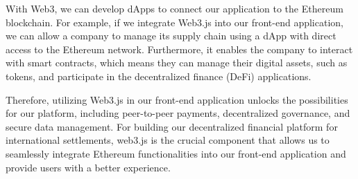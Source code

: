 With Web3, we can develop dApps to connect our application to the Ethereum blockchain. For example, if we integrate Web3.js into our front-end application,
we can allow a company to manage its supply chain using a dApp with direct access to the Ethereum network. Furthermore, it enables the company to
interact with smart contracts, which means they can manage their digital assets, such as tokens,  and participate in the decentralized finance (DeFi) applications.


Therefore, utilizing Web3.js in our front-end application unlocks the possibilities for our platform, including peer-to-peer payments, decentralized
governance, and secure data management. For building our decentralized financial platform for international settlements, web3.js is the crucial component that allows us to
seamlessly integrate Ethereum functionalities into our front-end application and provide users with a better experience.


